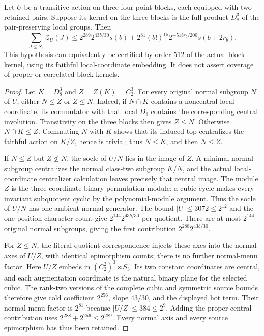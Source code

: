 \begin{proposition}
\label{prop:three-full-pair-kernels-source}
Let $U$ be a transitive action on three four-point blocks, each equipped
with two retained pairs. Suppose its kernel on the three blocks is the
full product $D_8^3$ of the pair-preserving local groups. Then
\[
 \sum_{J\leq S_b}\mathcal Z_U(J)
 \leq 2^{289}2^{43b/30}s(b)
       +2^{81}(b!)^{15}2^{-51br_b/200}s(b+2r_b).
\]
This hypothesis can equivalently be certified by order $512$ of the
actual block kernel, using its faithful local-coordinate embedding.
It does not assert coverage of proper or correlated block kernels.
\end{proposition}
\begin{proof}
Let $K=D_8^3$ and $Z=Z(K)=C_2^3$. For every original normal subgroup
$N$ of $U$, either $N\leq Z$ or $Z\leq N$. Indeed, if $N\cap K$
contains a noncentral local coordinate, its commutator with that local
$D_8$ contains the corresponding central involution. Transitivity on
the three blocks then gives $Z\leq N$. Otherwise $N\cap K\leq Z$.
Commuting $N$ with $K$ shows that its induced top centralizes the
faithful action on $K/Z$, hence is trivial; thus $N\leq K$, and then
$N\leq Z$.

If $N\leq Z$ but $Z\not\leq N$, the socle of $U/N$ lies in the
image of $Z$. A minimal normal subgroup centralizes the normal
class-two subgroup $K/N$, and the actual local-coordinate centralizer
calculation leaves precisely that central image. The module $Z$ is
the three-coordinate binary permutation module; a cubic cycle makes
every invariant subquotient cyclic by the polynomial-module argument.
Thus the socle of $U/N$ has one ambient normal generator. The bound
$|U|\leq3072\leq2^{12}$ and the one-position character count give
$2^{144}2^{43b/30}$ per quotient. There are at most $2^{144}$ original
normal subgroups, giving the first contribution $2^{288}2^{43b/30}$.

For $Z\leq N$, the literal quotient correspondence injects these
axes into the normal axes of $U/Z$, with identical epimorphism counts;
there is no further normal-menu factor. Here $U/Z$ embeds in
$(C_2^2)^3\rtimes S_3$. Its two constant coordinates are central,
and each augmentation coordinate is the natural binary plane for
the selected cubic. The rank-two versions of the complete cubic and
symmetric source bounds therefore give cold coefficient $2^{256}$,
slope $43/30$, and the displayed hot term. Their normal-menu factor
is $2^{81}$ because $|U/Z|\leq384\leq2^9$.
Adding the proper-central contribution uses
$2^{288}+2^{256}\leq2^{289}$. Every normal axis and every source
epimorphism has thus been retained.
\end{proof}

